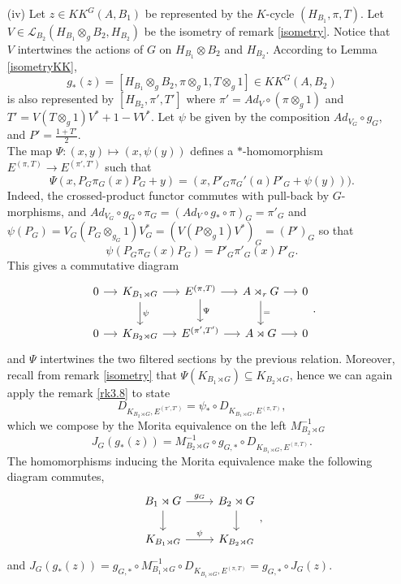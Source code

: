 \begin{dem}
\begin{enumerate}

\item[(iv)] %
Let $z \in KK^G(A,B_1)$ be represented by the $K$-cycle $(H_{B_1},\pi,T)$. Let $V\in \mathcal L_{B_2}(H_{B_1}\otimes_g B_2,H_{B_2})$ be the isometry of remark \ref{isometry}. Notice that $V$ intertwines the actions of $G$ on $ H_{B_1}\otimes B_2 $ and $H_{B_2}$. According to Lemma \ref{isometryKK}, 
\[g_*(z)=[H_{B_1}\otimes_g B_2, \pi\otimes_g 1, T\otimes_g 1]\in KK^G(A,B_2)\] 
is also represented by $[H_{B_2}, \pi',T' ]$ where $\pi' = Ad_{V}\circ (\pi\otimes_g 1)$ and $T' = V(T\otimes_g 1)V^* +1-VV^*$. Let $\psi$ be given by the composition $Ad_{V_G}\circ g_G$, and $P' = \frac{1+T'}{2}$.\\
The map $\Psi :(x,y)\mapsto (x, \psi(y))$ defines a $*$-homomorphism $E^{(\pi,T)} \rightarrow E^{(\pi',T')}$ such that 
\[\Psi(x,P_G\pi_G(x)P_G +y)= (x, P'_G  \pi_G'(a)P'_G + \psi(y)) ).\] 
Indeed, the crossed-product functor commutes with pull-back by $G$-morphisms, and $Ad_{V_G}\circ g_G \circ\pi_G= (Ad_V\circ g_* \circ \pi)_G = \pi'_G$ and $\psi(P_G)= V_G (P_G\otimes_{g_G} 1)V^*_G = (V(P\otimes_g 1 ) V^*)_G = (P')_G$ so that 
\[\psi(P_G \pi_G(x) P_G)=P'_G \pi'_G(x) P'_G. \]
This gives a commutative diagram 
\[\begin{tikzcd}[column sep = small]
0\arrow{r} & K_{B_1\rtimes G}\arrow{r}\arrow{d}{\psi} & E^{(\pi,T)} \arrow{r}\arrow{d}{\Psi}& A\rtimes_r G\arrow{r}\arrow{d}{=} & 0\\
0\arrow{r} & K_{B_2\rtimes G}\arrow{r} & E^{(\pi',T')} \arrow{r}& A\rtimes G\arrow{r} & 0
\end{tikzcd}.\]
and $\Psi$ intertwines the two filtered sections by the previous relation. Moreover, recall from remark \ref{isometry} that $\Psi( K_{B_1\rtimes G})\subseteq K_{B_2\rtimes G}$, hence we can again apply the remark \ref{rk3.8} to state
\[ D_{K_{B_2\rtimes G},E^{(\pi',T')}}=\psi_*\circ D_{K_{B_1\rtimes G},E^{(\pi,T)}},\]
which we compose by the Morita equivalence on the left $M_{B_2\rtimes G}^{-1}$
\[J_G(g_*(z)) = M_{B_2\rtimes G}^{-1}\circ g_{G,*}\circ D_{K_{B_1\rtimes G},E^{(\pi,T)}}.\]
The homomorphisms inducing the Morita equivalence make the following diagram commutes,
\[\begin{tikzcd}B_1\rtimes G\arrow{r}{g_G}\arrow{d} & B_2\rtimes G\arrow{d} \\ K_{B_1\rtimes G } \arrow{r}{\psi}& K_{B_2\rtimes G }\end{tikzcd},\]
and $J_G(g_*(z))= g_{G,*}\circ M_{B_1\rtimes G}^{-1}\circ D_{K_{B_1\rtimes G},E^{(\pi,T)}}=g_{G,*}\circ J_G(z)$.\\


\end{enumerate}
\end{dem}
